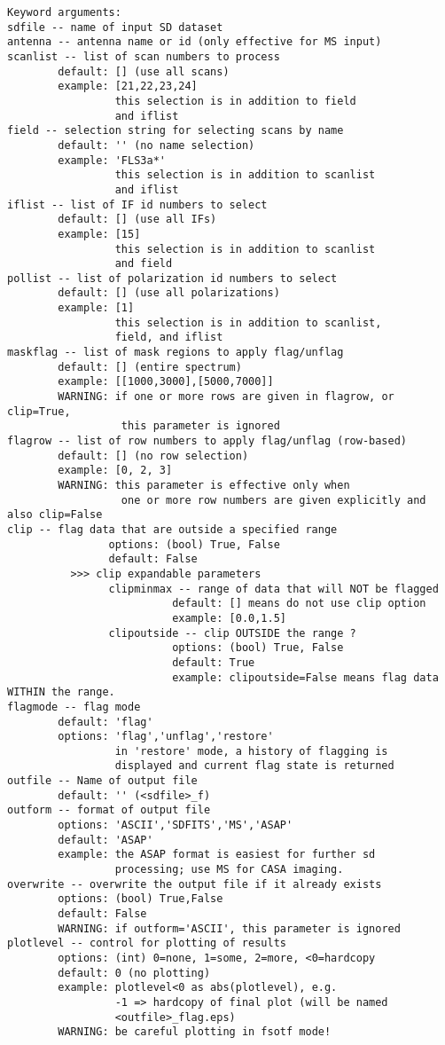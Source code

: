 \begin{verbatim}
Keyword arguments:
sdfile -- name of input SD dataset
antenna -- antenna name or id (only effective for MS input)
scanlist -- list of scan numbers to process
        default: [] (use all scans)
        example: [21,22,23,24]
                 this selection is in addition to field
                 and iflist
field -- selection string for selecting scans by name
        default: '' (no name selection)
        example: 'FLS3a*'
                 this selection is in addition to scanlist
                 and iflist
iflist -- list of IF id numbers to select
        default: [] (use all IFs)
        example: [15]
                 this selection is in addition to scanlist
                 and field
pollist -- list of polarization id numbers to select
        default: [] (use all polarizations)
        example: [1]
                 this selection is in addition to scanlist,
                 field, and iflist
maskflag -- list of mask regions to apply flag/unflag 
        default: [] (entire spectrum)
        example: [[1000,3000],[5000,7000]]
        WARNING: if one or more rows are given in flagrow, or clip=True, 
                  this parameter is ignored
flagrow -- list of row numbers to apply flag/unflag (row-based)
        default: [] (no row selection)
        example: [0, 2, 3]
        WARNING: this parameter is effective only when 
                  one or more row numbers are given explicitly and also clip=False
clip -- flag data that are outside a specified range
                options: (bool) True, False
                default: False
          >>> clip expandable parameters
                clipminmax -- range of data that will NOT be flagged
                          default: [] means do not use clip option
                          example: [0.0,1.5]
                clipoutside -- clip OUTSIDE the range ?
                          options: (bool) True, False
                          default: True
                          example: clipoutside=False means flag data WITHIN the range.
flagmode -- flag mode
        default: 'flag'
        options: 'flag','unflag','restore'
                 in 'restore' mode, a history of flagging is 
                 displayed and current flag state is returned
outfile -- Name of output file
        default: '' (<sdfile>_f)
outform -- format of output file
        options: 'ASCII','SDFITS','MS','ASAP'
        default: 'ASAP'
        example: the ASAP format is easiest for further sd
                 processing; use MS for CASA imaging.
overwrite -- overwrite the output file if it already exists
        options: (bool) True,False
        default: False
        WARNING: if outform='ASCII', this parameter is ignored 
plotlevel -- control for plotting of results
        options: (int) 0=none, 1=some, 2=more, <0=hardcopy
        default: 0 (no plotting)
        example: plotlevel<0 as abs(plotlevel), e.g.
                 -1 => hardcopy of final plot (will be named
                 <outfile>_flag.eps)
        WARNING: be careful plotting in fsotf mode!


\end{verbatim}
